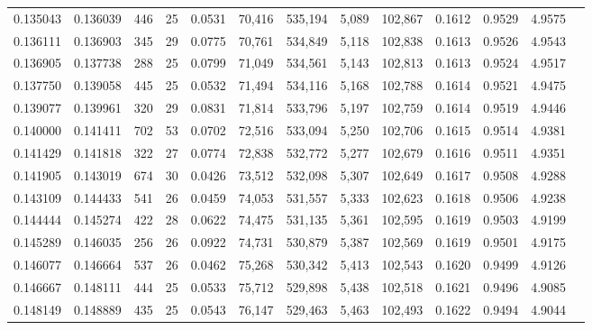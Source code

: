 \begin{tabular}{rrrrrrrrrrrrr}
0.135043 & 0.136039 &    446 &    25 &                                     0.0531 &  70,416 & 535,194 &   5,089 & 102,867 & 0.1612 & 0.9529 & 4.9575 \\
0.136111 & 0.136903 &    345 &    29 &                                     0.0775 &  70,761 & 534,849 &   5,118 & 102,838 & 0.1613 & 0.9526 & 4.9543 \\
0.136905 & 0.137738 &    288 &    25 &                                     0.0799 &  71,049 & 534,561 &   5,143 & 102,813 & 0.1613 & 0.9524 & 4.9517 \\
0.137750 & 0.139058 &    445 &    25 &                                     0.0532 &  71,494 & 534,116 &   5,168 & 102,788 & 0.1614 & 0.9521 & 4.9475 \\
0.139077 & 0.139961 &    320 &    29 &                                     0.0831 &  71,814 & 533,796 &   5,197 & 102,759 & 0.1614 & 0.9519 & 4.9446 \\
0.140000 & 0.141411 &    702 &    53 &                                     0.0702 &  72,516 & 533,094 &   5,250 & 102,706 & 0.1615 & 0.9514 & 4.9381 \\
0.141429 & 0.141818 &    322 &    27 &                                     0.0774 &  72,838 & 532,772 &   5,277 & 102,679 & 0.1616 & 0.9511 & 4.9351 \\
0.141905 & 0.143019 &    674 &    30 &                                     0.0426 &  73,512 & 532,098 &   5,307 & 102,649 & 0.1617 & 0.9508 & 4.9288 \\
0.143109 & 0.144433 &    541 &    26 &                                     0.0459 &  74,053 & 531,557 &   5,333 & 102,623 & 0.1618 & 0.9506 & 4.9238 \\
0.144444 & 0.145274 &    422 &    28 &                                     0.0622 &  74,475 & 531,135 &   5,361 & 102,595 & 0.1619 & 0.9503 & 4.9199 \\
0.145289 & 0.146035 &    256 &    26 &                                     0.0922 &  74,731 & 530,879 &   5,387 & 102,569 & 0.1619 & 0.9501 & 4.9175 \\
0.146077 & 0.146664 &    537 &    26 &                                     0.0462 &  75,268 & 530,342 &   5,413 & 102,543 & 0.1620 & 0.9499 & 4.9126 \\
0.146667 & 0.148111 &    444 &    25 &                                     0.0533 &  75,712 & 529,898 &   5,438 & 102,518 & 0.1621 & 0.9496 & 4.9085 \\
0.148149 & 0.148889 &    435 &    25 &                                     0.0543 &  76,147 & 529,463 &   5,463 & 102,493 & 0.1622 & 0.9494 & 4.9044 \\

\end{tabular}

